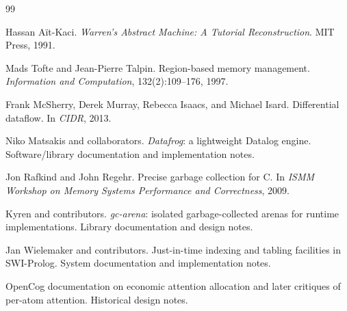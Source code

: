 \documentclass[11pt]{article}
\begin{document}
\begin{thebibliography}{99}

Hassan A\"it-Kaci.
\newblock \emph{Warren's Abstract Machine: A Tutorial Reconstruction}.
\newblock MIT Press, 1991.

Mads Tofte and Jean-Pierre Talpin.
\newblock Region-based memory management.
\newblock \emph{Information and Computation}, 132(2):109--176, 1997.

Frank McSherry, Derek Murray, Rebecca Isaacs, and Michael Isard.
\newblock Differential dataflow.
\newblock In \emph{CIDR}, 2013.

Niko Matsakis and collaborators.
\newblock \emph{Datafrog}: a lightweight Datalog engine.
\newblock Software/library documentation and implementation notes.

Jon Rafkind and John Regehr.
\newblock Precise garbage collection for C.
\newblock In \emph{ISMM Workshop on Memory Systems Performance and Correctness}, 2009.

Kyren and contributors.
\newblock \emph{gc-arena}: isolated garbage-collected arenas for runtime implementations.
\newblock Library documentation and design notes.

Jan Wielemaker and contributors.
\newblock Just-in-time indexing and tabling facilities in SWI-Prolog.
\newblock System documentation and implementation notes.

OpenCog documentation on economic attention allocation and later critiques of per-atom attention.
\newblock Historical design notes.

\end{thebibliography}
\end{document}

